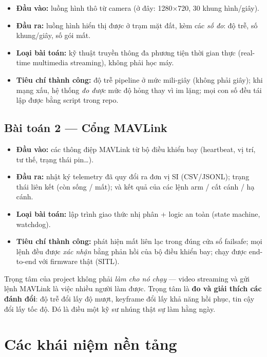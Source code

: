 \documentclass[12pt]{ai_conquer2026}
\begin{document}
\begin{itemize}
\item \textbf{Đầu vào:} luồng hình thô từ camera (ở đây: 1280$\times$720, 30 khung
      hình/giây).
\item \textbf{Đầu ra:} luồng hình hiển thị được ở trạm mặt đất, kèm các \emph{số
      đo}: độ trễ, số khung/giây, số gói mất.
\item \textbf{Loại bài toán:} kỹ thuật truyền thông đa phương tiện thời gian
      thực (real-time multimedia streaming), không phải học máy.
\item \textbf{Tiêu chí thành công:} độ trễ pipeline ở mức mili-giây (không phải
      giây); khi mạng xấu, hệ thống \emph{đo được} mức độ hỏng thay vì im lặng;
      mọi con số đều tái lập được bằng script trong repo.
\end{itemize}

\subsection{Bài toán 2 --- Cổng MAVLink}

\begin{itemize}
\item \textbf{Đầu vào:} các thông điệp MAVLink từ bộ điều khiển bay (heartbeat,
      vị trí, tư thế, trạng thái pin\ldots).
\item \textbf{Đầu ra:} nhật ký telemetry đã quy đổi ra đơn vị SI (CSV/JSONL);
      trạng thái liên kết (còn sống / mất); và kết quả của các lệnh arm / cất
      cánh / hạ cánh.
\item \textbf{Loại bài toán:} lập trình giao thức nhị phân + logic an toàn (state
      machine, watchdog).
\item \textbf{Tiêu chí thành công:} phát hiện mất liên lạc trong đúng cửa sổ
      failsafe; mọi lệnh đều được \emph{xác nhận} bằng phản hồi của bộ điều khiển
      bay; chạy được end-to-end với firmware thật (SITL).
\end{itemize}

\begin{aivncodebox}
Trọng tâm của project không phải \emph{làm cho nó chạy} --- video streaming và
gửi lệnh MAVLink là việc nhiều người làm được. Trọng tâm là \textbf{đo và giải
thích các đánh đổi}: độ trễ đổi lấy độ mượt, keyframe đổi lấy khả năng hồi phục,
tin cậy đổi lấy tốc độ. Đó là điều một kỹ sư nhúng thật sự làm hằng ngày.
\end{aivncodebox}

\section{Các khái niệm nền tảng}
\end{document}
